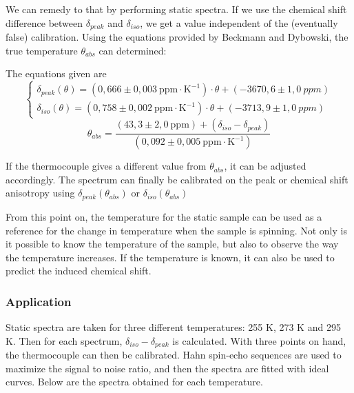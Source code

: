 \documentclass[12pt]{article}
\begin{document}
We can remedy to that by performing static spectra. If we use the chemical shift difference between $\delta_{peak}$ and $\delta_{iso}$, we get a value independent of the (eventually false) calibration. Using the equations provided by Beckmann and Dybowski, the true temperature $\theta_{abs}$ can determined:

The equations given are
\[
\begin{cases}
    \delta_{peak}(\theta) = (0,666 \pm 0,003 \ \text{ppm}\cdot\text{K}^{-1}) \cdot \theta + (-3670,6 \pm 1,0 \ ppm) \\
    \delta_{iso}(\theta) = (0,758 \pm 0,002 \ \text{ppm}\cdot\text{K}^{-1}) \cdot \theta + (-3713,9 \pm 1,0 \ ppm) 
\end{cases}
\]
\[
\theta_{abs} = \frac{(43,3 \pm 2,0 \ \text{ppm} ) + (\delta_{iso} - \delta_{peak})}{(0,092 \pm 0,005 \ \text{ppm} \cdot \text{K}^{-1})}
\] \medskip

If the thermocouple gives a different value from $\theta_{abs}$, it can be adjusted accordingly. The spectrum can finally be calibrated on the peak or chemical shift anisotropy using $\delta_{peak}(\theta_{abs})$ or $\delta_{iso}(\theta_{abs})$

From this point on, the temperature for the static sample can be used as a reference for the change in temperature when the sample is spinning. Not only is it possible to know the temperature of the sample, but also to observe the way the temperature increases. If the temperature is known, it can also be used to predict the induced chemical shift.

\subsubsection{Application}

Static spectra are taken for three different temperatures: 255 K, 273 K and 295 K. Then for each spectrum, $\delta_{iso} - \delta_{peak}$ is calculated. With three points on hand, the thermocouple can then be calibrated. Hahn spin-echo sequences are used to maximize the signal to noise ratio, and then the spectra are fitted with ideal curves. Below are the spectra obtained for each temperature.
\end{document}
